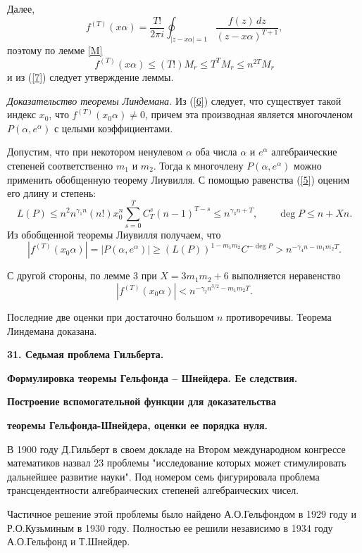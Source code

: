 \documentclass[12pt]{article}
\begin{document}
Далее,
$$
f^{(T)}(x\alpha)= \frac{T!}{2\pi i}\oint_{|z-x\alpha|=1} \frac
{f(z)\,dz}{(z-x\alpha)^{T+1}},
$$
поэтому по лемме \ref{M}
$$
f^{(T)}(x\alpha) \le (T!)M_r \le T^TM_r \le n^{2T}M_r
$$
и из (\ref{7}) следует утверждение леммы.


\emph{Доказательство теоремы Линдемана.} Из
(\ref{6}) следует, что существует такой индекс
$x_0$, что $f^{(T)}(x_0\alpha) \ne 0$, причем эта
производная является многочленом
$P(\alpha,e^{\alpha})$ с целыми коэффициентами.

Допустим, что при некотором ненулевом $\alpha$
оба числа $\alpha$  и $e^{\alpha}$ алгебраические
степеней соответственно $m_1$ и $m_2$. Тогда к
многочлену $P(\alpha, e^{\alpha}) $ можно
применить обобщенную теорему Лиувилля. С помощью
равенства (\ref{5}) оценим его длину и степень:
$$
L(P) \le n^2n^{\gamma_1n}(n!)x_0^n\sum_{s=0}^TC_T^s(n-1)^{T-s} \le
n^{\gamma_3n+T}, \qquad \deg P \le n+Xn.
$$
Из обобщенной теоремы Лиувилля получаем, что
$$
|f^{(T)}(x_0\alpha)|=|P(\alpha, e^{\alpha})|\ge
(L(P))^{1-m_1m_2}C^{-\deg P} > n^{-\gamma_4n-m_1m_2T}.
$$


С другой стороны, по лемме 3 при $X=3m_1m_2+6$ выполняется
неравенство
$$
|f^{(T)}(x_0\alpha)| <n^{-\gamma_2n^{3/2}-m_1m_2T}.
$$

Последние две оценки при достаточно большом $n$ противоречивы.
Теорема Линдемана  доказана.


\break

 \vskip 5mm \centerline{\bf {31. Седьмая
проблема Гильберта.}} \centerline{\bf
{Формулировка теоремы Гельфонда -- Шнейдера. Ее
следствия.}}

\centerline{\bf { Построение вспомогательной
функции для доказательства}} \centerline{\bf
{теоремы Гельфонда-Шнейдера, оценки ее порядка
нуля.}} \vskip 5mm

В 1900 году Д.Гильберт в своем докладе на Втором международном
конгрессе математиков назвал 23 проблемы "исследование которых
может стимулировать дальнейшее развитие науки". Под номером семь
фигурировала проблема трансцендентности алгебраических степеней
алгебраических чисел.

Частичное решение этой проблемы было найдено А.О.Гельфондом в 1929
году и Р.О.Кузьминым в 1930 году. Полностью ее решили независимо в
1934 году А.О.Гельфонд и Т.Шнейдер.
\end{document}
